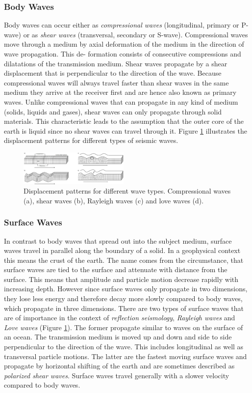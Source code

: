 \documentclass[twocolumn]{article}
\begin{document}
\subsubsection*{Body Waves}
Body waves can occur either as \textit{compressional waves} (longitudinal, primary or P-wave) or as \textit{shear waves} (transversal, secondary or S-wave). Compressional waves move through a medium by axial deformation of the medium in the direction of wave propagation. This de- formation consists of consecutive compressions and dilatations of the transmission medium. Shear waves propagate by a shear displacement that is perpendicular to the direction of the wave. Because compressional waves will always travel faster than shear waves in the same medium they arrive at the receiver first and are hence also known as primary waves. Unlike compressional waves that can propagate in any kind of medium (solids, liquids and gases), shear waves can only propagate through solid materials. This characteristic leads to the assumption that the outer core of the earth is liquid since no shear waves can travel through it. Figure \ref{displacement} illustrates the displacement patterns for different types of seismic waves.
\begin{figure}[htb]
        \centering
        \includegraphics[width=0.48\textwidth]{displacement}
        \caption{Displacement patterns for different wave types. Compressional waves (a), shear waves (b), Rayleigh waves (c) and love waves (d).}
        \label{displacement}
\end{figure}

\subsubsection*{Surface Waves}
In contrast to body waves that spread out into the subject medium, surface waves travel in parallel along the boundary of a solid. 
In a geophysical context this means the crust of the earth. The name comes from the circumstance, that surface waves are tied to the surface and attenuate with distance from the surface. This means that amplitude and particle motion decrease rapidly with increasing depth. However since surface waves only propagate in two dimensions, they lose less energy and therefore decay more slowly compared to body waves, which propagate in three dimensions. There are two types of surface waves that are of importance in the context of \textit{reflection seismology}, \textit{Rayleigh waves} and \textit{Love waves} (Figure \ref{displacement}). The former propagate similar to waves on the surface of an ocean. The transmission medium is moved up and down and side to side perpendicular to the direction of the wave. This includes longitudinal as well as transversal particle motions. The latter are the fastest moving surface waves and propagate by horizontal shifting of the earth and are sometimes described as \textit{polarized shear waves}. Surface waves travel generally with a slower velocity compared to body waves.
\end{document}

